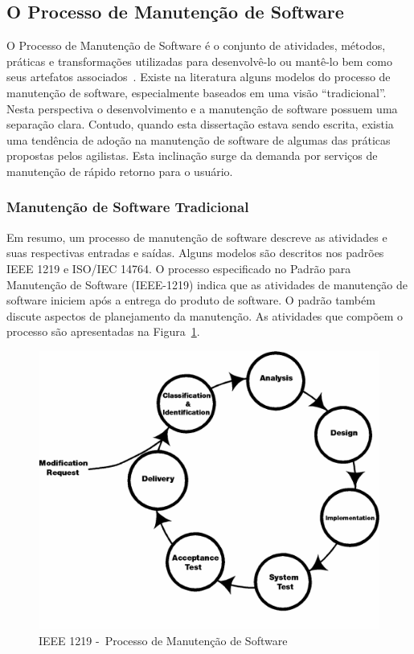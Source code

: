 \subsection{O Processo de Manutenção de Software}
\label{sec:o_processo_de_manutecao_de_software}

O Processo de Manutenção de Software é o conjunto de atividades, métodos,
práticas e transformações utilizadas para desenvolvê-lo ou mantê-lo bem como
seus artefatos associados~\cite{paulk1993key}. Existe na literatura alguns
modelos do processo de manutenção de software, especialmente baseados em uma
visão ``tradicional''. Nesta perspectiva o desenvolvimento e a manutenção de
software possuem uma separação clara. Contudo, quando esta dissertação estava
sendo escrita, existia uma tendência de adoção na manutenção de software de
algumas das práticas propostas pelos agilistas. Esta inclinação surge da demanda
por serviços de manutenção de rápido retorno para o usuário.


\subsubsection{Manutenção de Software Tradicional}
\label{subsec:manutenção_de_software_tradicional}

Em resumo, um processo de manutenção de software descreve as atividades e suas
respectivas entradas e saídas. Alguns modelos são descritos nos padrões IEEE
1219 e ISO/IEC 14764. O processo especificado no Padrão para Manutenção de
Software (IEEE\@-\@1219) indica que as atividades de manutenção de software
iniciem após a entrega do produto de software. O padrão também discute aspectos
de planejamento da manutenção. As atividades que compõem o processo são
apresentadas na Figura~\ref{fig:ieee-1219-processo-man-software}.

\begin{figure}[htpb] \centering
	\includegraphics[width=0.7\linewidth]{./chapter-manutencao-software-visao-geral/img/ieee_1219_98_processo_manutencao.png}
	\caption{IEEE 1219 -~Processo de Manutenção de
		Software}\label{fig:ieee-1219-processo-man-software}
\end{figure}

